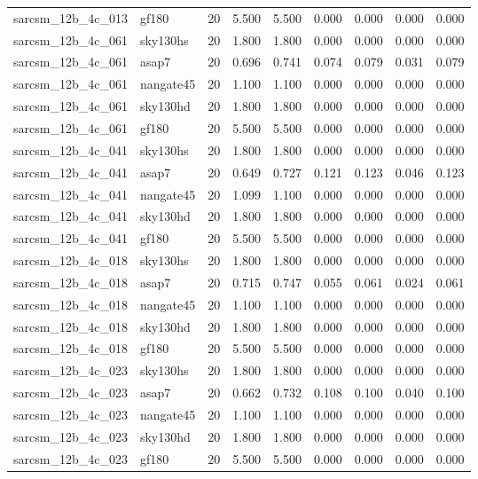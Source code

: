 \begin{tabular}{llrrrrrrr}
sarcsm\_12b\_4c\_013 & gf180 & 20 & 5.500 & 5.500 & 0.000 & 0.000 & 0.000 & 0.000 \\
sarcsm\_12b\_4c\_061 & sky130hs & 20 & 1.800 & 1.800 & 0.000 & 0.000 & 0.000 & 0.000 \\
sarcsm\_12b\_4c\_061 & asap7 & 20 & 0.696 & 0.741 & 0.074 & 0.079 & 0.031 & 0.079 \\
sarcsm\_12b\_4c\_061 & nangate45 & 20 & 1.100 & 1.100 & 0.000 & 0.000 & 0.000 & 0.000 \\
sarcsm\_12b\_4c\_061 & sky130hd & 20 & 1.800 & 1.800 & 0.000 & 0.000 & 0.000 & 0.000 \\
sarcsm\_12b\_4c\_061 & gf180 & 20 & 5.500 & 5.500 & 0.000 & 0.000 & 0.000 & 0.000 \\
sarcsm\_12b\_4c\_041 & sky130hs & 20 & 1.800 & 1.800 & 0.000 & 0.000 & 0.000 & 0.000 \\
sarcsm\_12b\_4c\_041 & asap7 & 20 & 0.649 & 0.727 & 0.121 & 0.123 & 0.046 & 0.123 \\
sarcsm\_12b\_4c\_041 & nangate45 & 20 & 1.099 & 1.100 & 0.000 & 0.000 & 0.000 & 0.000 \\
sarcsm\_12b\_4c\_041 & sky130hd & 20 & 1.800 & 1.800 & 0.000 & 0.000 & 0.000 & 0.000 \\
sarcsm\_12b\_4c\_041 & gf180 & 20 & 5.500 & 5.500 & 0.000 & 0.000 & 0.000 & 0.000 \\
sarcsm\_12b\_4c\_018 & sky130hs & 20 & 1.800 & 1.800 & 0.000 & 0.000 & 0.000 & 0.000 \\
sarcsm\_12b\_4c\_018 & asap7 & 20 & 0.715 & 0.747 & 0.055 & 0.061 & 0.024 & 0.061 \\
sarcsm\_12b\_4c\_018 & nangate45 & 20 & 1.100 & 1.100 & 0.000 & 0.000 & 0.000 & 0.000 \\
sarcsm\_12b\_4c\_018 & sky130hd & 20 & 1.800 & 1.800 & 0.000 & 0.000 & 0.000 & 0.000 \\
sarcsm\_12b\_4c\_018 & gf180 & 20 & 5.500 & 5.500 & 0.000 & 0.000 & 0.000 & 0.000 \\
sarcsm\_12b\_4c\_023 & sky130hs & 20 & 1.800 & 1.800 & 0.000 & 0.000 & 0.000 & 0.000 \\
sarcsm\_12b\_4c\_023 & asap7 & 20 & 0.662 & 0.732 & 0.108 & 0.100 & 0.040 & 0.100 \\
sarcsm\_12b\_4c\_023 & nangate45 & 20 & 1.100 & 1.100 & 0.000 & 0.000 & 0.000 & 0.000 \\
sarcsm\_12b\_4c\_023 & sky130hd & 20 & 1.800 & 1.800 & 0.000 & 0.000 & 0.000 & 0.000 \\
sarcsm\_12b\_4c\_023 & gf180 & 20 & 5.500 & 5.500 & 0.000 & 0.000 & 0.000 & 0.000 \\

\end{tabular}
